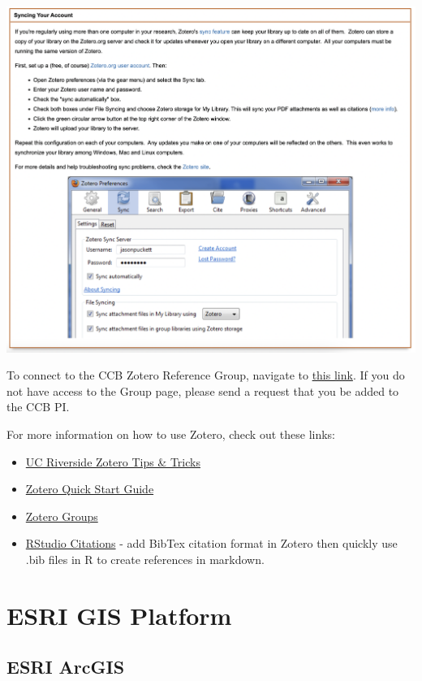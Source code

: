 \documentclass[
]{book}
\providecommand{\tightlist}{%
  \setlength{\itemsep}{0pt}\setlength{\parskip}{0pt}}
\begin{document}
\begin{center}\includegraphics[width=0.8\linewidth]{images/zoterosyncing} \end{center}

To connect to the CCB Zotero Reference Group, navigate to \href{https://www.zotero.org/groups/4734848/ccbucr}{this link}. If you do not have access to the Group page, please send a request that you be added to the CCB PI.

For more information on how to use Zotero, check out these links:

\begin{itemize}
\tightlist
\item
  \href{https://guides.lib.ucr.edu/c.php?g=171064\&p=1126842}{UC Riverside Zotero Tips \& Tricks}
\item
  \href{https://www.zotero.org/support/quick_start_guide}{Zotero Quick Start Guide}
\item
  \href{https://www.zotero.org/support/groups}{Zotero Groups}
\item
  \href{https://www.youtube.com/watch?v=zuuOYjE8m98}{RStudio Citations} - add BibTex citation format in Zotero then quickly use .bib files in R to create references in markdown.
\end{itemize}

\hypertarget{esri}{%
\chapter{ESRI GIS Platform}\label{esri}}

\hypertarget{esri-arcgis}{%
\section{ESRI ArcGIS}\label{esri-arcgis}}
\end{document}
